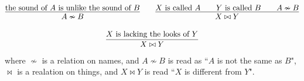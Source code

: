 \documentclass[11pt]{article}
\begin{document}
%
%
%
%
%
%
%
%
%
%
%
%







\begin{gather*}
\infer{A\nsim B}{\text{the sound of $A$ is unlike the sound of $B$}}\qquad \infer{X\bowtie Y}{\text{$X$ is called $A$} & & \text{$Y$ is called $B$} && A\nsim B}\\[8pt]
\infer{X\bowtie Y}{\text{$X$ is lacking the looks of $Y$}}
\end{gather*}
where $\nsim$ is a relation on names, and $A\nsim B$ is read as ``$A$ is not the same as $B$", $\bowtie$ is a realation on things, and $X\bowtie Y$ is read ``$X$ is different from $Y$".
\end{document}
